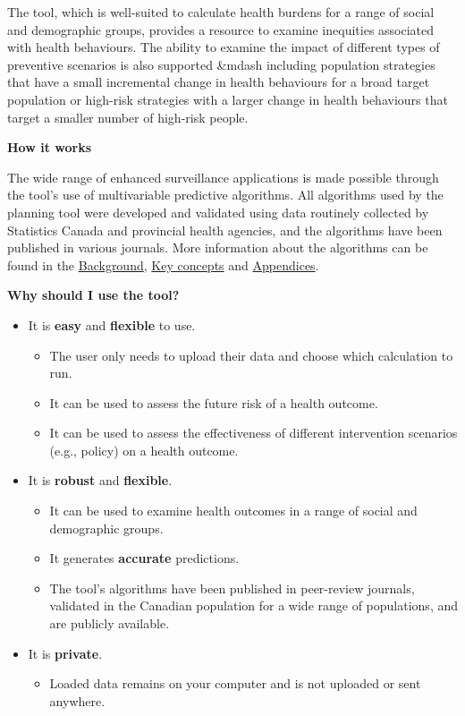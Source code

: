 \documentclass[]{book}
\providecommand{\tightlist}{%
  \setlength{\itemsep}{0pt}\setlength{\parskip}{0pt}}
\begin{document}
The tool, which is well-suited to calculate health burdens for a range of social and demographic groups, provides a resource to examine inequities associated with health behaviours.\citep{manuel2018} The ability to examine the impact of different types of preventive scenarios is also supported \&mdash including population strategies that have a small incremental change in health behaviours for a broad target population or high-risk strategies with a larger change in health behaviours that target a smaller number of high-risk people.\citep{PoRTover}

\textbf{How it works}

The wide range of enhanced surveillance applications is made possible through the tool's use of multivariable predictive algorithms. All algorithms used by the planning tool were developed and validated using data routinely collected by Statistics Canada and provincial health agencies, and the algorithms have been published in various journals. More information about the algorithms can be found in the \protect\hyperlink{background}{Background}, \protect\hyperlink{keyconcepts}{Key concepts} and \protect\hyperlink{mport}{Appendices}.

\textbf{Why should I use the tool?}

\begin{itemize}
\item
  It is \textbf{easy} and \textbf{flexible} to use.

  \begin{itemize}
  \tightlist
  \item
    The user only needs to upload their data and choose which calculation to run.
  \item
    It can be used to assess the future risk of a health outcome.
  \item
    It can be used to assess the effectiveness of different intervention scenarios (e.g., policy) on a health outcome.
  \end{itemize}
\item
  It is \textbf{robust} and \textbf{flexible}.

  \begin{itemize}
  \tightlist
  \item
    It can be used to examine health outcomes in a range of social and demographic groups.
  \item
    It generates \textbf{accurate} predictions.
  \item
    The tool's algorithms have been published in peer-review journals, validated in the Canadian population for a wide range of populations, and are publicly available.
  \end{itemize}
\item
  It is \textbf{private}.

  \begin{itemize}
  \tightlist
  \item
    Loaded data remains on your computer and is not uploaded or sent anywhere.
  \end{itemize}
\end{itemize}
\end{document}
